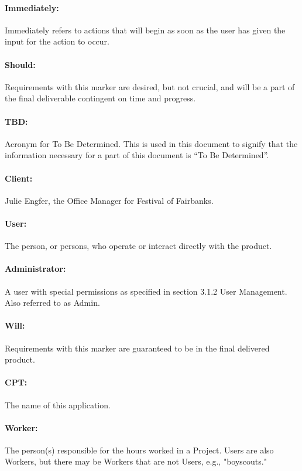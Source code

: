 \documentclass[12pt]{article}
\begin{document}
\paragraph{Immediately:} Immediately refers to actions that will begin as soon as the user has given the input for the action to occur.
\paragraph{Should:} Requirements with this marker are desired, but not crucial, and will be a part of the final deliverable contingent on time and progress.
\paragraph{TBD:} Acronym for To Be Determined. This is used in this document to signify that the information necessary for a part of this document is ``To Be Determined''.
\paragraph{Client:} Julie Engfer, the Office Manager for Festival of Fairbanks.
\paragraph{User:} The person, or persons, who operate or interact directly with the product.
\paragraph{Administrator:} A user with special permissions as specified in section 3.1.2 User Management. Also referred to as Admin.
\paragraph{Will:} Requirements with this marker are guaranteed to be in the final delivered product.
\paragraph{CPT:} The name of this application.
\paragraph{Worker:} The person(s) responsible for the hours worked in a Project. Users are also Workers, but there may be Workers that are not Users, e.g., "boyscouts."
\end{document}
